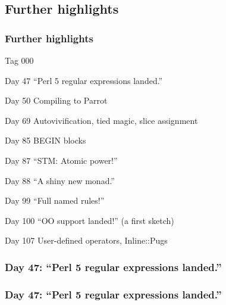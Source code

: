 \documentclass[12pt,compress,english,utf8,t]{beamer}
\newcommand{\inputminted}[2]{}
\begin{document}
\subsection{Further highlights}

\begin{frame}[label=further-highlights]\frametitle{Further highlights}
  \begin{Mdescription}{Tag 000}
    \item[Day 47] ``Perl 5 regular expressions landed.''
    \hyperlink{perl5re}{}

    \item[Day 50] Compiling to Parrot

    \item[Day 69] Autovivification, tied magic, slice
    assignment \hyperlink{tied-env}{}

    \item[Day 85] BEGIN blocks
    \hyperlink{begin-blocks}{}

    \item[Day 87] ``STM: Atomic power!''
    \hyperlink{stm}{}

    \item[Day 88] ``A shiny new monad.''
    \hyperlink{shiny-monad}{}

    \item[Day 99] ``Full named rules!''
    \hyperlink{rules}{}

    \item[Day 100] ``OO support landed!'' (a first sketch)

    \item[Day 107] User-defined operators, Inline::Pugs
    \hyperlink{user-defined-ops}{}
  \end{Mdescription}

  \hyperlink{the-end}{}
\end{frame}



\subsubsection{Day 47: ``Perl 5 regular expressions landed.''}

\begin{frame}[label=perl5re]\frametitle{Day 47: ``Perl 5 regular expressions landed.''}
  \inputminted{text}{code-snippets/day47-regex.pl}

  \hyperlink{further-highlights}{}
\end{frame}
\end{document}
